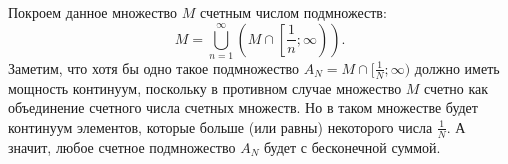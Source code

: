 \documentclass{article}
\begin{document}
Покроем данное множество $M$ счетным числом подмножеств:
$$M = \bigcup_{n=1}^\infty \left(M \cap \left[ \frac{1}{n}; \infty \right)\right).$$
Заметим, что хотя бы одно такое подмножество $A_N = M \cap [ \frac{1}{N}; \infty )$ должно иметь мощность континуум, поскольку в противном случае множество $M$ счетно как объединение счетного числа счетных множеств. Но в таком множестве будет континуум элементов, которые больше (или равны) некоторого числа $\frac{1}{N}$. А значит, любое счетное подмножество $A_N$ будет с бесконечной суммой. 
\end{document}
